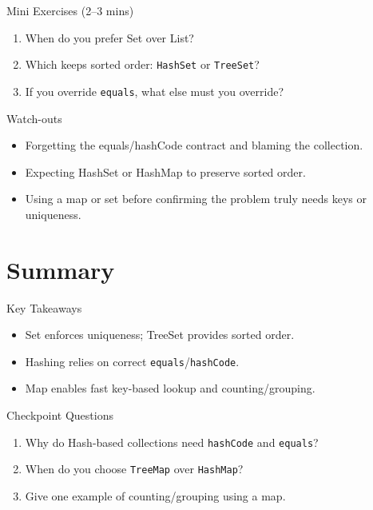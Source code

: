 \documentclass{beamer}
\begin{document}
\begin{frame}{Mini Exercises (2--3 mins)}
  \begin{enumerate}[<+->]
    \item When do you prefer Set over List?
    \item Which keeps sorted order: \texttt{HashSet} or \texttt{TreeSet}?
    \item If you override \texttt{equals}, what else must you override?
  \end{enumerate}
  \slidesources{\OOPSUnitVSources}
\end{frame}

\begin{frame}{Watch-outs}
\begin{itemize}[<+->]
  \item Forgetting the equals/hashCode contract and blaming the collection.
  \item Expecting HashSet or HashMap to preserve sorted order.
  \item Using a map or set before confirming the problem truly needs keys or uniqueness.
\end{itemize}
  \slidesources{\OOPSUnitVSources}
\end{frame}

\section{Summary}
\label{sec:summary}

\begin{frame}{Key Takeaways}
  \begin{itemize}[<+->]
    \item Set enforces uniqueness; TreeSet provides sorted order.
    \item Hashing relies on correct \texttt{equals}/\texttt{hashCode}.
    \item Map enables fast key-based lookup and counting/grouping.
  \end{itemize}
  \slidesources{\OOPSUnitVSources}
\end{frame}

\begin{frame}{Checkpoint Questions}
  \begin{enumerate}[<+->]
    \item Why do Hash-based collections need \texttt{hashCode} and \texttt{equals}?
    \item When do you choose \texttt{TreeMap} over \texttt{HashMap}?
    \item Give one example of counting/grouping using a map.
  \end{enumerate}
  \slidesources{\OOPSUnitVSources}
\end{frame}
\end{document}
